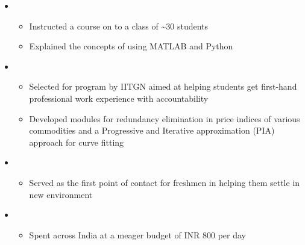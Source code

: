 \documentclass[mm]{simple_style}
\begin{document}
\begin{resume}
\begin{itemize}[label={}, leftmargin=0pt, topsep=0pt]
    \item {} 
        \begin{itemize}[label={}, topsep=3pt]
            \item Instructed \iffalse Developed and instructed \fi a course on  to a class of \textasciitilde 30 students
            \item Explained the concepts of  using MATLAB and Python
        \end{itemize}
        
    \item {} 
        \begin{itemize}[label={}, topsep=3pt]
            \item Selected for  program by IITGN aimed at helping students get first-hand professional work experience with accountability 
            \iffalse
            \item Assisted Prof. Mohan Joshi for his course on \cusemph{Mathematical Methods in Engineering} 
            \fi
            \item Developed modules for redundancy elimination in price indices of various commodities and a Progressive and Iterative approximation (PIA) approach for curve fitting  
        \end{itemize}
        
    \item {} 
        \begin{itemize}[label={}, topsep=3pt]
            \item Served as the first point of contact for freshmen in helping them settle in new environment
        \end{itemize}
        
    \item {} 
        \begin{itemize}[label={}, topsep=3pt]
            \item Spent  across India at a meager budget of INR $800$ per day 
        \end{itemize}
        

\end{itemize}
\end{resume}
\end{document}
